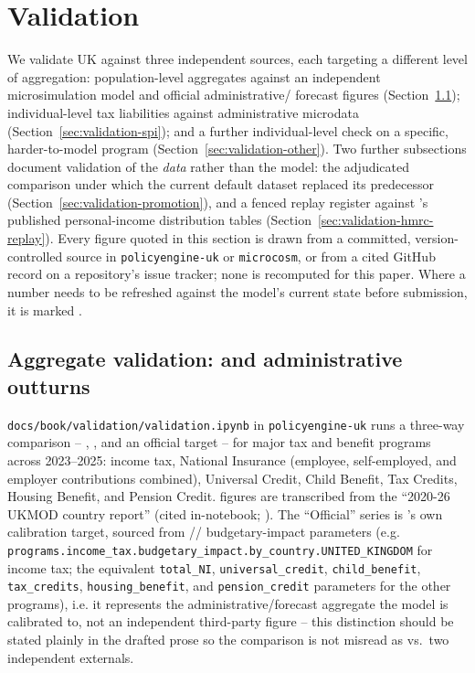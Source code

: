 \section{Validation}
\label{sec:validation}

We validate \policyengine{} UK against three independent sources, each
targeting a different level of aggregation: population-level aggregates
against an independent microsimulation model and official administrative/
forecast figures (Section~\ref{sec:validation-ukmod}); individual-level tax
liabilities against \hmrc{} administrative microdata
(Section~\ref{sec:validation-spi}); and a further individual-level check on
a specific, harder-to-model program (Section~\ref{sec:validation-other}).
Two further subsections document validation of the \emph{data} rather than
the model: the adjudicated comparison under which the current default
dataset replaced its predecessor
(Section~\ref{sec:validation-promotion}), and a fenced replay register
against \hmrc{}'s published personal-income distribution tables
(Section~\ref{sec:validation-hmrc-replay}). Every figure quoted in this
section is drawn from a committed, version-controlled source in
\texttt{policyengine-uk} or \texttt{microcosm}, or from a cited GitHub
record on a \policyengine{} repository's issue tracker; none is recomputed
for this paper. Where a number needs to be refreshed against the model's
current state before submission, it is marked .

\subsection{Aggregate validation: \ukmod{} and administrative outturns}
\label{sec:validation-ukmod}

\texttt{docs/book/validation/validation.ipynb} in \texttt{policyengine-uk}
runs a three-way comparison -- \policyengine{}, \ukmod{}, and an official
target -- for major tax and benefit programs across 2023--2025: income tax,
National Insurance (employee, self-employed, and employer contributions
combined), Universal Credit, Child Benefit, Tax Credits, Housing Benefit,
and Pension Credit. \ukmod{} figures are transcribed from the ``2020-26
UKMOD country report'' (cited in-notebook; ).
The ``Official'' series is \policyengine{}'s own calibration target,
sourced from \obr{}/\hmrc{}/\dwp{} budgetary-impact parameters (e.g.
\texttt{programs.income\_tax.budgetary\_impact.by\_country.UNITED\_KINGDOM}
for income tax; the equivalent \texttt{total\_NI}, \texttt{universal\_credit},
\texttt{child\_benefit}, \texttt{tax\_credits}, \texttt{housing\_benefit}, and
\texttt{pension\_credit} parameters for the other programs), i.e. it
represents the administrative/forecast aggregate the model is calibrated
to, not an independent third-party figure -- this distinction should be
stated plainly in the drafted prose so the comparison is not misread as
\policyengine{} vs.\ two independent externals.

